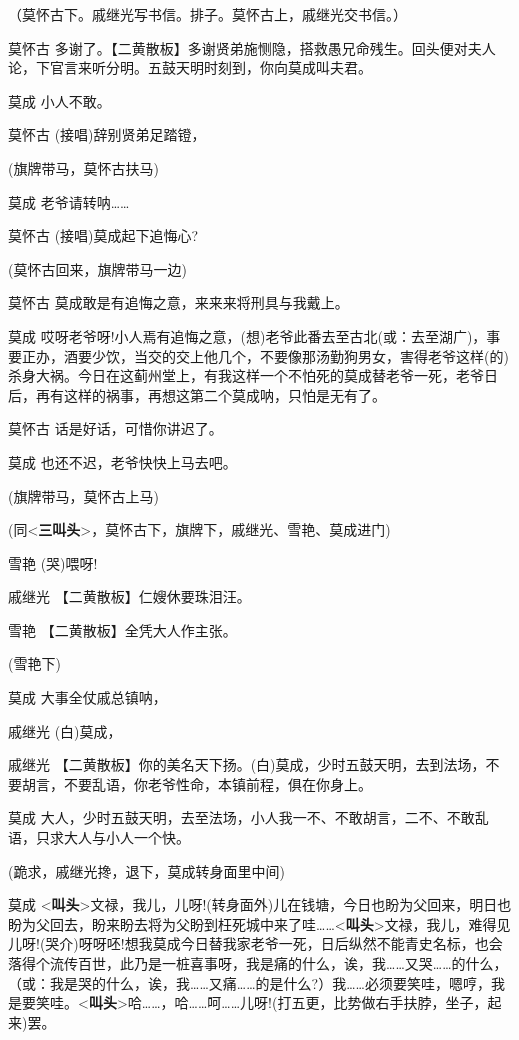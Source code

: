 （莫怀古下。戚继光写书信。排子。莫怀古上，戚继光交书信。）

莫怀古
多谢了。【二黄散板】多谢贤弟施恻隐，搭救愚兄命残生。回头便对夫人论，下官言来听分明。五鼓天明时刻到，你向莫成叫夫君。

莫成 小人不敢。

莫怀古 (接唱)辞别贤弟足踏镫，

(旗牌带马，莫怀古扶马)

莫成 老爷请转呐\ldots{}\ldots{}

莫怀古 (接唱)莫成起下追悔心?

(莫怀古回来，旗牌带马一边)

莫怀古 莫成敢是有追悔之意，来来来将刑具与我戴上。

莫成
哎呀老爷呀!小人焉有追悔之意，(想)老爷此番去至古北(或：去至湖广)，事要正办，酒要少饮，当交的交上他几个，不要像那汤勤狗男女，害得老爷这样(的)杀身大祸。今日在这蓟州堂上，有我这样一个不怕死的莫成替老爷一死，老爷日后，再有这样的祸事，再想这第二个莫成呐，只怕是无有了。

莫怀古 话是好话，可惜你讲迟了。

莫成 也还不迟，老爷快快上马去吧。

(旗牌带马，莫怀古上马)

(同\textless{}\textbf{三叫头}\textgreater{}，莫怀古下，旗牌下，戚继光、雪艳、莫成进门)

雪艳 (哭)喂呀!

戚继光 【二黄散板】仁嫂休要珠泪汪。

雪艳 【二黄散板】全凭大人作主张。

(雪艳下)

莫成 大事全仗戚总镇呐，

戚继光 (白)莫成，

戚继光
【二黄散板】你的美名天下扬。(白)莫成，少时五鼓天明，去到法场，不要胡言，不要乱语，你老爷性命，本镇前程，俱在你身上。

莫成
大人，少时五鼓天明，去至法场，小人我一不、不敢胡言，二不、不敢乱语，只求大人与小人一个快。

(跪求，戚继光搀，退下，莫成转身面里中间)

莫成
\textless{}\textbf{叫头}\textgreater{}文禄，我儿，儿呀!(转身面外)儿在钱塘，今日也盼为父回来，明日也盼为父回去，盼来盼去将为父盼到枉死城中来了哇\ldots{}\ldots{}\textless{}\textbf{叫头}\textgreater{}文禄，我儿，难得见儿呀!(哭介)呀呀呸!想我莫成今日替我家老爷一死，日后纵然不能青史名标，也会落得个流传百世，此乃是一桩喜事呀，我是痛的什么，诶，我\ldots{}\ldots{}又哭\ldots{}\ldots{}的什么，（或：我是哭的什么，诶，我\ldots{}\ldots{}又痛\ldots{}\ldots{}的是什么?）我\ldots{}\ldots{}必须要笑哇，嗯哼，我是要笑哇。\textless{}\textbf{叫头}\textgreater{}哈\ldots{}\ldots{}，哈\ldots{}\ldots{}呵\ldots{}\ldots{}儿呀!(打五更，比势做右手扶脖，坐子，起来)罢。


